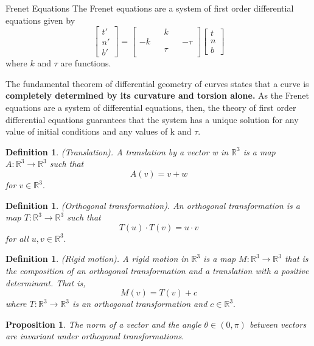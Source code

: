 \documentclass[twoside]{article}
\newtheorem{proposition}[theorem]{Proposition}
\newtheorem{definition}[theorem]{Definition}
\begin{document}
\begin{definition_exam}{Frenet Equations}{} The Frenet equations are a system of first order differential equations given by 
$$
\begin{bmatrix} t' \\ n' \\ b' \end{bmatrix} = \begin{bmatrix}&&k&&\\-k&& &&-\tau \\ && \tau && \\ \end{bmatrix} \begin{bmatrix}t\\n\\b \end{bmatrix}
$$
where $k$ and $\tau$ are functions.
\end{definition_exam}

The fundamental theorem of differential geometry of curves states that a curve is \textbf{completely determined by its curvature and torsion alone.} As the Frenet equations are a system of differential equations, then, the theory of first order differential equations guarantees that the system has a unique solution for any value of initial conditions and any values of k and $\tau.$

\begin{definition}(Translation). A translation by a vector w in $\mathbb{R}^3$ is a map $A: \mathbb{R}^3 \rightarrow \mathbb{R}^3$ such that 
$$
A(v) = v + w
$$
for $v \in \mathbb{R}^3.$
\end{definition}

\begin{definition}(Orthogonal transformation). An orthogonal transformation is a map $T: \mathbb{R}^3 \rightarrow \mathbb{R}^3$ such that 
$$
T(u)\cdot T(v) = u \cdot v
$$
for all $u,v \in \mathbb{R}^3.$
\end{definition}

\begin{definition}(Rigid motion). A rigid motion in $\mathbb{R}^3$ is a map $M: \mathbb{R}^3 \rightarrow \mathbb{R}^3$ that is the composition of an orthogonal transformation and a translation with a positive determinant. That is, 
$$
M(v) = T(v) + c
$$
where $T: \mathbb{R}^3 \rightarrow \mathbb{R}^3$ is an orthogonal transformation and $c \in \mathbb{R}^3.$
\end{definition}

\begin{proposition}The norm of a vector and the angle $\theta \in (0,\pi)$ between vectors are invariant under orthogonal transformations.
\end{proposition}
\end{document}
